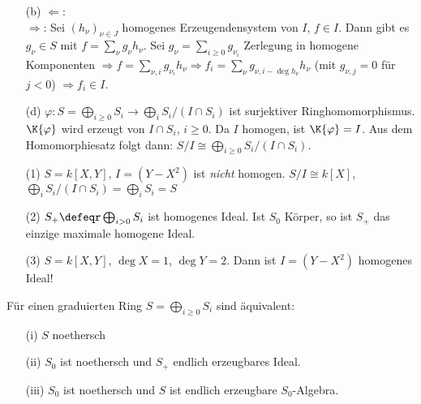 \begin{Bew}
\begin{enumerate}
\item[(b)] \glqq$\Leftarrow$\grqq: \chk\\
\glqq$\Rightarrow$\grqq: Sei $(h_{\nu})_{\nu\in J}$ homogenes Erzeugendensystem von $I$,
$f\in I$. Dann gibt es $g_\nu\in S$ mit $f=\sum_{\nu}g_\nu h_\nu$.
Sei $g_\nu=\sum_{i\geq 0}g_{\nu_i}$ Zerlegung in homogene Komponenten
$\Rightarrow f=\sum_{\nu, i} g_{\nu_i}h_\nu
\Rightarrow f_i=\sum_\nu g_{\nu,i-\deg{h_\nu}}h_\nu$ 
(mit $g_{\nu,j}=0$ f\"ur $j< 0$) $\Rightarrow f_i\in I$.

\item[(d)] $\varphi:S=\bigoplus_{i\geq 0}S_i\to \bigoplus_i S_i/(I\cap S_i)$ ist
surjektiver Ringhomomorphismus. $\K{\varphi}$ wird erzeugt von $I\cap S_i$, $i\geq 0$.
Da $I$ homogen, ist $\K{\varphi}=I$. Aus dem Homomorphiesatz folgt dann:
$S/I\cong \bigoplus_{i\geq 0}S_i/(I\cap S_i)$.
\end{enumerate}
\end{Bew}

\begin{nnBsp}
\begin{enumerate}

\item[(1)] $S=k[X,Y]$, $I=(Y-X^2)$ ist \emph{nicht} homogen.
$S/I\cong k[X]$, $\bigoplus_i S_i/(I\cap S_i)=\bigoplus_i S_i=S$

\item[(2)] $S_{+}\defeqr\bigoplus_{i> 0}S_i$ ist homogenes Ideal.
Ist $S_0$ K\"orper, so ist $S_{+}$ das einzige maximale homogene Ideal.

\item[(3)] $S=k[X,Y]$, $\deg{X}=1$, $\deg{Y}=2$. 
Dann ist $I=(Y-X^2)$ homogenes Ideal!

\end{enumerate}
\end{nnBsp}

\begin{DefBem}
\label{2.15}
F\"ur einen graduierten Ring $S=\bigoplus_{i\geq 0} S_i$ sind \"aquivalent:
\begin{enumerate}
\item[(i)] $S$ noethersch
\item[(ii)] $S_0$ ist noethersch und $S_{+}$ endlich erzeugbares Ideal.
\item[(iii)] $S_0$ ist noethersch und $S$ ist endlich erzeugbare $S_0$-Algebra.
\end{enumerate}
\end{DefBem}

